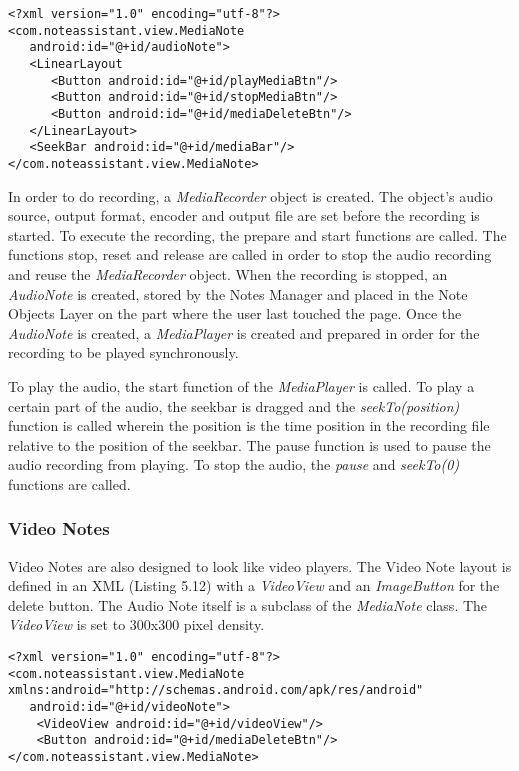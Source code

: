 \begin{lstlisting}[frame=single, label=lst:audionotexml, caption=Code of audio\_note.xml]
<?xml version="1.0" encoding="utf-8"?>
<com.noteassistant.view.MediaNote 
   android:id="@+id/audioNote">
   <LinearLayout
      <Button android:id="@+id/playMediaBtn"/>
      <Button android:id="@+id/stopMediaBtn"/>
      <Button android:id="@+id/mediaDeleteBtn"/>
   </LinearLayout>
   <SeekBar android:id="@+id/mediaBar"/>
</com.noteassistant.view.MediaNote>
\end{lstlisting}

In order to do recording, a \textit{MediaRecorder} object is created. The object's audio source, output format, encoder and output file are set before the recording is started. To execute the recording, the prepare and start functions are called. The functions stop, reset and release are called in order to stop the audio recording and reuse the \textit{MediaRecorder} object. When the recording is stopped, an \textit{AudioNote} is created, stored by the Notes Manager and placed in the Note Objects Layer on the part where the user last touched the page. Once the \textit{AudioNote} is created, a \textit{MediaPlayer} is created and prepared in order for the recording to be played synchronously. 

To play the audio, the start function of the \textit{MediaPlayer} is called. To play a certain part of the audio, the seekbar is dragged and the \textit{seekTo(position)} function is called wherein the position is the time position in the recording file relative to the position of the seekbar. The pause function is used to pause the audio recording from playing. To stop the audio, the \textit{pause} and \textit{seekTo(0)} functions are called.

\subsubsection{Video Notes}
\label{sec:videonotes}

Video Notes are also designed to look like video players. The Video Note layout is defined in an XML (Listing 5.12) with a \textit{VideoView} and an \textit{ImageButton} for the delete button. The Audio Note itself is a subclass of the \textit{MediaNote} class. The \textit{VideoView} is set to 300x300 pixel density.

\begin{lstlisting}[frame=single, label=lst:videonotexml, caption=Code of video\_note.xml]
<?xml version="1.0" encoding="utf-8"?>
<com.noteassistant.view.MediaNote xmlns:android="http://schemas.android.com/apk/res/android"
   android:id="@+id/videoNote">
    <VideoView android:id="@+id/videoView"/>
    <Button android:id="@+id/mediaDeleteBtn"/>
</com.noteassistant.view.MediaNote>
\end{lstlisting}

